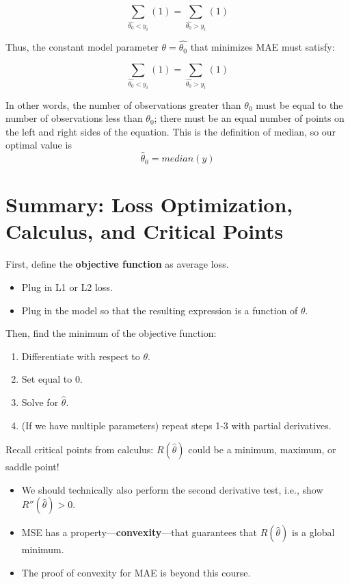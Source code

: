 \documentclass[
  letterpaper,
  DIV=11,
  numbers=noendperiod]{scrreprt}
\providecommand{\tightlist}{%
  \setlength{\itemsep}{0pt}\setlength{\parskip}{0pt}}\usepackage{longtable,booktabs,array}
\begin{document}
\[\sum_{\hat{\theta_0} < y_i} (1) = \sum_{\hat{\theta_0} > y_i} (1) \]

Thus, the constant model parameter \(\theta = \hat{\theta_0}\) that
minimizes MAE must satisfy:

\[ \sum_{\hat{\theta_0} < y_i} (1) = \sum_{\hat{\theta_0} > y_i} (1) \]

In other words, the number of observations greater than \(\theta_0\)
must be equal to the number of observations less than \(\theta_0\);
there must be an equal number of points on the left and right sides of
the equation. This is the definition of median, so our optimal value is
\[ \hat{\theta}_0 = median(y) \]

\section{Summary: Loss Optimization, Calculus, and Critical
Points}\label{summary-loss-optimization-calculus-and-critical-points}

First, define the \textbf{objective function} as average loss.

\begin{itemize}
\tightlist
\item
  Plug in L1 or L2 loss.
\item
  Plug in the model so that the resulting expression is a function of
  \(\theta\).
\end{itemize}

Then, find the minimum of the objective function:

\begin{enumerate}
\def\labelenumi{\arabic{enumi}.}
\tightlist
\item
  Differentiate with respect to \(\theta\).
\item
  Set equal to 0.
\item
  Solve for \(\hat{\theta}\).
\item
  (If we have multiple parameters) repeat steps 1-3 with partial
  derivatives.
\end{enumerate}

Recall critical points from calculus: \(R(\hat{\theta})\) could be a
minimum, maximum, or saddle point!

\begin{itemize}
\tightlist
\item
  We should technically also perform the second derivative test, i.e.,
  show \(R''(\hat{\theta}) > 0\).
\item
  MSE has a property---\textbf{convexity}---that guarantees that
  \(R(\hat{\theta})\) is a global minimum.
\item
  The proof of convexity for MAE is beyond this course.
\end{itemize}
\end{document}
